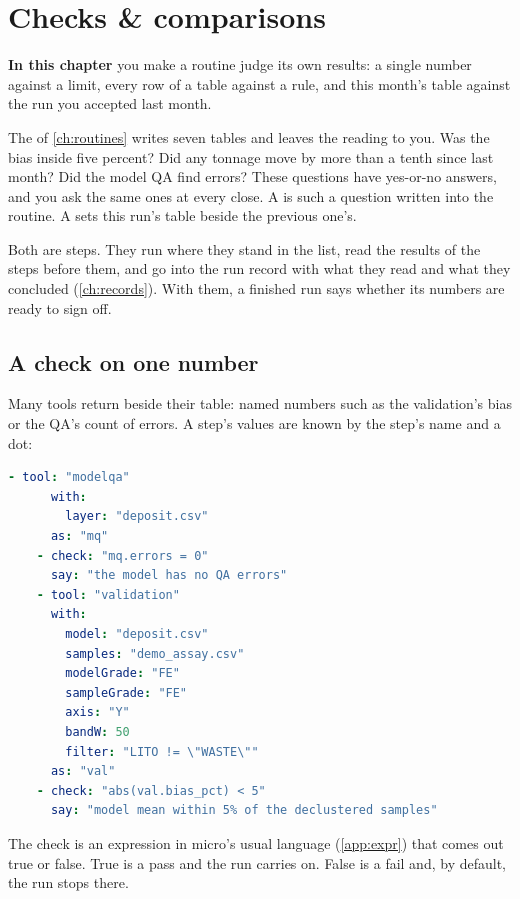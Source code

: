 \chapter{Checks \& comparisons}\label{ch:checks}
\begin{goals}
\textbf{In this chapter} you make a routine judge its own results: a single number against a limit, every row of a table against a rule, and this month's table against the run you accepted last month.
\end{goals}

The  of \cref{ch:routines} writes seven tables and leaves the reading to you. Was the bias inside five percent? Did any tonnage move by more than a tenth since last month? Did the model QA find errors? These questions have yes-or-no answers, and you ask the same ones at every close. A  is such a question written into the routine. A  sets this run's table beside the previous one's.

Both are steps. They run where they stand in the list, read the results of the steps before them, and go into the run record with what they read and what they concluded (\cref{ch:records}). With them, a finished run says whether its numbers are ready to sign off.

\section{A check on one number}\label{sec:checks-scalar}
Many tools return  beside their table: named numbers such as the validation's bias or the QA's count of errors. A step's values are known by the step's  name and a dot:

\begin{lstlisting}[language=yaml]
    - tool: "modelqa"
      with:
        layer: "deposit.csv"
      as: "mq"
    - check: "mq.errors = 0"
      say: "the model has no QA errors"
    - tool: "validation"
      with:
        model: "deposit.csv"
        samples: "demo_assay.csv"
        modelGrade: "FE"
        sampleGrade: "FE"
        axis: "Y"
        bandW: 50
        filter: "LITO != \"WASTE\""
      as: "val"
    - check: "abs(val.bias_pct) < 5"
      say: "model mean within 5% of the declustered samples"
\end{lstlisting}

The check is an expression in micro's usual language (\cref{app:expr}) that comes out true or false. True is a pass and the run carries on. False is a fail and, by default, the run stops there.

